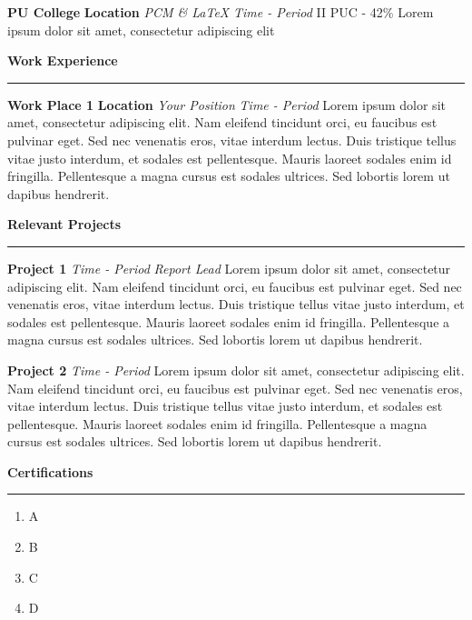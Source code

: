 \documentclass{article}[12pt]
\begin{document}
    \vskip9pt
    
    \large \textbf{PU College} \hfill \textbf{Location}
    \newline \textit{PCM \& LaTeX} \hfill \textit{Time - Period}
    \vskip3pt
    II PUC - 42\%
    \newline Lorem ipsum dolor sit amet, consectetur adipiscing elit
    
    \vskip6pt
    
    \huge{\textbf{Work Experience}}
    \vskip6pt \hrule height 0.6pt \relax 
    \vskip6pt
    \large \textbf{Work Place 1} \hfill \textbf{Location}
    \newline \textit{Your Position} \hfill \textit{Time - Period}
    \vskip3pt
    Lorem ipsum dolor sit amet, consectetur adipiscing elit. Nam eleifend tincidunt orci, eu faucibus est pulvinar eget. Sed nec venenatis eros, vitae interdum lectus. Duis tristique tellus vitae justo interdum, et sodales est pellentesque. Mauris laoreet sodales enim id fringilla. Pellentesque a magna cursus est sodales ultrices. Sed lobortis lorem ut dapibus hendrerit.
    
    \vskip6pt
    
    \huge{\textbf{Relevant Projects}}
    \vskip6pt \hrule height 0.6pt \relax 
    \vskip6pt
    \large \textbf{Project 1} \hfill \textit{Time - Period}
    \newline \textit{Report Lead}
    \vskip3pt
    Lorem ipsum dolor sit amet, consectetur adipiscing elit. Nam eleifend tincidunt orci, eu faucibus est pulvinar eget. Sed nec venenatis eros, vitae interdum lectus. Duis tristique tellus vitae justo interdum, et sodales est pellentesque. Mauris laoreet sodales enim id fringilla. Pellentesque a magna cursus est sodales ultrices. Sed lobortis lorem ut dapibus hendrerit.
    
    \vskip6pt
    
    \large \textbf{Project 2} \hfill \textit{Time - Period}
    \vskip3pt
    Lorem ipsum dolor sit amet, consectetur adipiscing elit. Nam eleifend tincidunt orci, eu faucibus est pulvinar eget. Sed nec venenatis eros, vitae interdum lectus. Duis tristique tellus vitae justo interdum, et sodales est pellentesque. Mauris laoreet sodales enim id fringilla. Pellentesque a magna cursus est sodales ultrices. Sed lobortis lorem ut dapibus hendrerit.    
    
    \vskip6pt
    \huge{\textbf{Certifications}}
    \vskip9pt \hrule height 0.6pt \relax 
    \vskip6pt
    \begin{enumerate}
        \normalsize
        \setlength{\itemsep}{0pt}
        \item A
        \item B 
        \item C
        \item D
    \end{enumerate}
   
\end{document}
